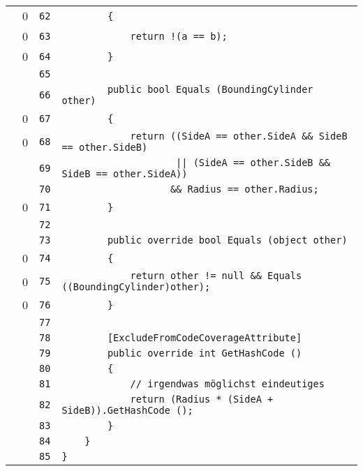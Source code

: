 \documentclass[a4paper,10pt]{article}
\begin{document}
\begin{longtable}[l]{lrrl}
\cellcolor{red} & 0 & \verb~62~ & \verb~        {~\\
\cellcolor{red} & 0 & \verb~63~ & \verb~            return !(a == b);~\\
\cellcolor{red} & 0 & \verb~64~ & \verb~        }~\\
\cellcolor{gray} &  & \verb~65~ & \verb~~\\
\cellcolor{gray} &  & \verb~66~ & \verb~        public bool Equals (BoundingCylinder other)~\\
\cellcolor{red} & 0 & \verb~67~ & \verb~        {~\\
\cellcolor{red} & 0 & \verb~68~ & \verb~            return ((SideA == other.SideA && SideB == other.SideB)~\\
\cellcolor{gray} &  & \verb~69~ & \verb~                    || (SideA == other.SideB && SideB == other.SideA))~\\
\cellcolor{gray} &  & \verb~70~ & \verb~                   && Radius == other.Radius;~\\
\cellcolor{red} & 0 & \verb~71~ & \verb~        }~\\
\cellcolor{gray} &  & \verb~72~ & \verb~~\\
\cellcolor{gray} &  & \verb~73~ & \verb~        public override bool Equals (object other)~\\
\cellcolor{red} & 0 & \verb~74~ & \verb~        {~\\
\cellcolor{red} & 0 & \verb~75~ & \verb~            return other != null && Equals ((BoundingCylinder)other);~\\
\cellcolor{red} & 0 & \verb~76~ & \verb~        }~\\
\cellcolor{gray} &  & \verb~77~ & \verb~~\\
\cellcolor{gray} &  & \verb~78~ & \verb~        [ExcludeFromCodeCoverageAttribute]~\\
\cellcolor{gray} &  & \verb~79~ & \verb~        public override int GetHashCode ()~\\
\cellcolor{gray} &  & \verb~80~ & \verb~        {~\\
\cellcolor{gray} &  & \verb~81~ & \verb~            // irgendwas möglichst eindeutiges~\\
\cellcolor{gray} &  & \verb~82~ & \verb~            return (Radius * (SideA + SideB)).GetHashCode ();~\\
\cellcolor{gray} &  & \verb~83~ & \verb~        }~\\
\cellcolor{gray} &  & \verb~84~ & \verb~    }~\\
\cellcolor{gray} &  & \verb~85~ & \verb~}~\\
\end{longtable}
\newpage
\end{document}
